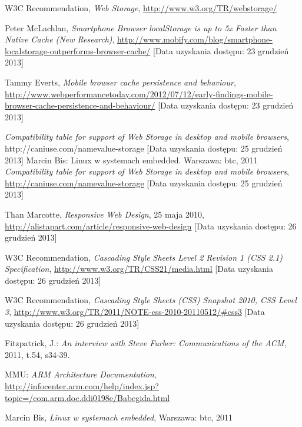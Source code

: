 \begin{thebibliography}{1}
   W3C Recommendation, {\em Web Storage}, \url{http://www.w3.org/TR/webstorage/}
  
   Peter McLachlan, \emph{Smartphone Browser localStorage is up to 5x Faster than Native Cache (New Research)}, \url{http://www.mobify.com/blog/smartphone-localstorage-outperforms-browser-cache/} [Data uzyskania dostępu: 23 grudzień 2013]

   Tammy Everts, \emph{Mobile browser cache persistence and behaviour}, \url{http://www.webperformancetoday.com/2012/07/12/early-findings-mobile-browser-cache-persistence-and-behaviour/} [Data uzyskania dostępu: 23 grudzień 2013]

   \emph{Compatibility table for support of Web Storage in desktop and mobile browsers}, http://caniuse.com/namevalue-storage [Data uzyskania dostępu: 25 grudzień 2013]
  Marcin Bis: Linux w systemach embedded. Warszawa: btc, 2011
   \emph{Compatibility table for support of Web Storage in desktop and mobile browsers}, \url{http://caniuse.com/namevalue-storage} [Data uzyskania dostępu: 25 grudzień 2013]
  
   Than Marcotte, \emph{Responsive Web Design}, 25 maja 2010, \url{http://alistapart.com/article/responsive-web-design} [Data uzyskania dostępu: 26 grudzień 2013]

   W3C Recommendation, \emph{Cascading Style Sheets Level 2 Revision 1 (CSS 2.1) Specification}, \url{http://www.w3.org/TR/CSS21/media.html} [Data uzyskania dostępu: 26 grudzień 2013]

   W3C Recommendation, \emph{Cascading Style Sheets (CSS) Snapshot 2010, CSS Level 3}, \url{http://www.w3.org/TR/2011/NOTE-css-2010-20110512/\#css3} [Data uzyskania dostępu: 26 grudzień 2013]

  Fitzpatrick, J.: \emph{An interview with Steve Furber: Communications of the ACM}, 2011, t.54, s34-39.
  
  MMU: \emph{ARM Architecture Documentation}, \url{http://infocenter.arm.com/help/index.jsp?topic=/com.arm.doc.ddi0198e/Babegida.html}

  Marcin Bis, \emph{Linux w systemach embedded}, Warszawa: btc, 2011

\end{thebibliography}
\listoftables

\listoffigures











